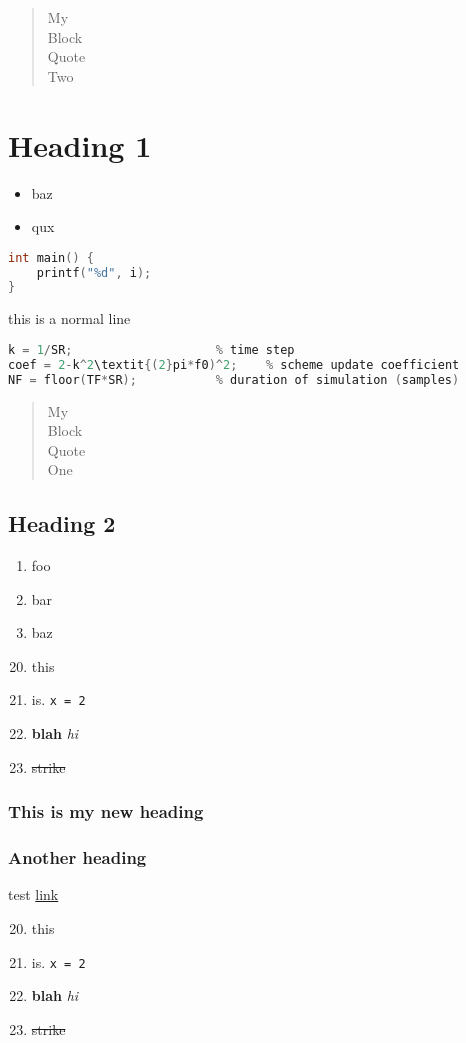 \documentclass{article}
\begin{document}
 
\setcounter{secnumdepth}{0}

    
\begin{quote}
My\\
Block\\
Quote\\
Two
\end{quote}

\section{Heading 1}
\begin{itemize}
    \item baz
    \item qux
\end{itemize}

\begin{lstlisting}[language=c, style=myStyle]
int main() {
    printf("%d", i);
}
\end{lstlisting}

this is a normal line

\begin{lstlisting}[language=c, style=myStyle]
% derived parameters
k = 1/SR;                    % time step
coef = 2-k^2\textit{(2}pi*f0)^2;    % scheme update coefficient
NF = floor(TF*SR);           % duration of simulation (samples)
\end{lstlisting}

\begin{quote}
My\\
Block\\
Quote\\
One
\end{quote}

\subsection{Heading 2}
\begin{enumerate}
    \setcounter{enumi}{0}
    \item foo
    \item bar
    \item baz
\end{enumerate}

\begin{enumerate}
    \setcounter{enumi}{19}
    \item this
    \item is. \verb|x = 2|
    \item \textbf{blah} \textit{hi}
    \item \sout{strike}
\end{enumerate}

\subsubsection{This is my new heading}
\subsubsection{Another heading}
test \href{https://duckduckgo.com}{link}

\begin{enumerate}
    \setcounter{enumi}{19}
    \item this
    \item is. \verb|x = 2|
    \item \textbf{blah} \textit{hi}
    \item \sout{strike}
\end{enumerate}
\end{document}
